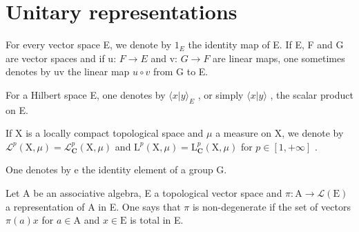 \chapter{Unitary representations}
\setcounter{exercisepar}{0}

For every vector space E, we denote by \(1_{E}\) the identity map of E. If E, F and G are vector spaces and if u: \(F \rightarrow E\) and v: \(G \rightarrow F\) are linear maps, one sometimes denotes by uv the linear map \(u \circ v\) from G to E.

For a Hilbert space E, one denotes by \(\langle x | y \rangle_{E}\) , or simply \(\langle x | y \rangle\) , the scalar product on E.

If X is a locally compact topological space and \(\mu\) a measure on X, we denote by \(\mathcal{L}^{p}(\mathrm{X},\mu)=\mathcal{L}_{\mathbf{C}}^{p}(\mathrm{X},\mu)\) and \(\mathrm{L}^{p}(\mathrm{X},\mu)=\mathrm{L}_{\mathbf{C}}^{p}(\mathrm{X},\mu)\) for \(p\in[1,+\infty]\) .

One denotes by e the identity element of a group G.

Let A be an associative algebra, E a topological vector space and \(\pi\colon\mathrm{A}\to\mathcal{L}(\mathrm{E})\) a representation of A in E. One says that \(\pi\) is non-degenerate if the set of vectors \(\pi(a)x\) for \(a\in\mathrm{A}\) and \(x\in\mathrm{E}\) is total in E.

